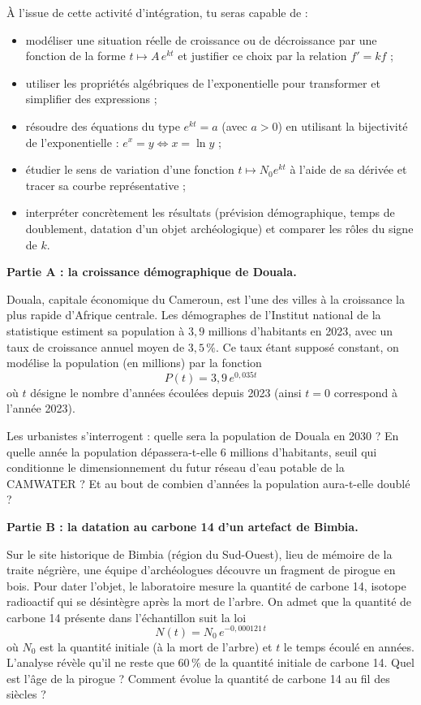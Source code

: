 \documentclass[11pt]{article}
\newcommand{\cle}[1]{{\popxbold\color{popdark}#1}}
\newcounter{popsec}
\newcounter{popsub}
\newcommand{\courssub}[1]{%
  \stepcounter{popsub}%
  \par\vspace{9pt}\noindent{\popxbold\fontsize{11.5}{13}\selectfont\color{popink}{\color{poporange}\thepopsec.\thepopsub}\hspace{6pt}#1}\par\nopagebreak\vspace{4pt}
}
\begin{document}
À l'issue de cette activité d'intégration, tu seras capable de :
\begin{itemize}
\item \cle{modéliser} une situation réelle de croissance ou de décroissance par une fonction de la forme $t \mapsto A\,e^{kt}$ et justifier ce choix par la relation $f' = kf$ ;
\item utiliser les \cle{propriétés algébriques} de l'exponentielle pour transformer et simplifier des expressions ;
\item \cle{résoudre} des équations du type $e^{kt} = a$ (avec $a > 0$) en utilisant la bijectivité de l'exponentielle : $e^x = y \iff x = \ln y$ ;
\item \cle{étudier} le sens de variation d'une fonction $t \mapsto N_0 e^{kt}$ à l'aide de sa dérivée et \cle{tracer} sa courbe représentative ;
\item interpréter concrètement les résultats (prévision démographique, temps de doublement, datation d'un objet archéologique) et comparer les rôles du signe de $k$.
\end{itemize}

\courssub{Situation}

\textbf{Partie A : la croissance démographique de Douala.}

Douala, capitale économique du Cameroun, est l'une des villes à la croissance la plus rapide d'Afrique centrale. Les démographes de l'Institut national de la statistique estiment sa population à $3,9$ millions d'habitants en 2023, avec un taux de croissance annuel moyen de $3,5\,\%$. Ce taux étant supposé constant, on modélise la population (en millions) par la fonction
\[ P(t) = 3,9\,e^{0,035t} \]
où $t$ désigne le nombre d'années écoulées depuis 2023 (ainsi $t = 0$ correspond à l'année 2023).

Les urbanistes s'interrogent : quelle sera la population de Douala en 2030 ? En quelle année la population dépassera-t-elle $6$ millions d'habitants, seuil qui conditionne le dimensionnement du futur réseau d'eau potable de la CAMWATER ? Et au bout de combien d'années la population aura-t-elle doublé ?

\textbf{Partie B : la datation au carbone 14 d'un artefact de Bimbia.}

Sur le site historique de Bimbia (région du Sud-Ouest), lieu de mémoire de la traite négrière, une équipe d'archéologues découvre un fragment de pirogue en bois. Pour dater l'objet, le laboratoire mesure la quantité de carbone 14, isotope radioactif qui se désintègre après la mort de l'arbre. On admet que la quantité de carbone 14 présente dans l'échantillon suit la loi
\[ N(t) = N_0\,e^{-0,000121\,t} \]
où $N_0$ est la quantité initiale (à la mort de l'arbre) et $t$ le temps écoulé en années. L'analyse révèle qu'il ne reste que $60\,\%$ de la quantité initiale de carbone 14. Quel est l'âge de la pirogue ? Comment évolue la quantité de carbone 14 au fil des siècles ?
\end{document}

